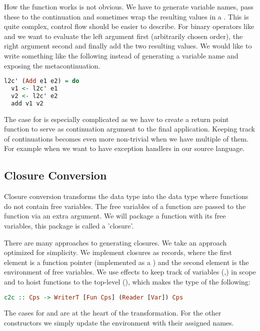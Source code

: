{How the  function works is not obvious. We have to generate variable names, pass these to the continuation and sometimes wrap the resulting values in a . This is quite complex, control flow should be easier to describe. For binary operators like  and  we want to evaluate the left argument first (arbitrarily chosen order), the right argument second and finally add the two resulting values. We would like to write something like the following instead of generating a variable name and exposing the metacontinuation.

\begin{lstlisting}[language=Haskell]
l2c' (Add e1 e2) = do
  v1 <- l2c' e1
  v2 <- l2c' e2
  add v1 v2
\end{lstlisting}

The case for  is especially complicated as we have to create a return point function to serve as continuation argument to the final application. Keeping track of continuations becomes even more non-trivial when we have multiple of them. For example when we want to have exception handlers in our source language.

\subsection{\label{section:closconvert}Closure Conversion}
Closure conversion transforms the  data type into the  data type where functions do not contain free variables. The free variables of a function are passed to the function via an extra argument. We will package a function with its free variables, this package is called a 'closure'.

There are many approaches to generating closures. We take an approach optimized for simplicity. We implement closures as records, where the first element is a function pointer (implemented as a ) and the second element is the environment of free variables. We use effects to keep track of variables (,) in scope and to hoist functions to the top-level (), which makes the type of  the following:

\begin{lstlisting}[language=Haskell]
c2c :: Cps -> WriterT [Fun Cps] (Reader [Var]) Cps
\end{lstlisting}

The cases for  and  are at the heart of the transformation. For the other constructors we simply update the environment with their assigned names.

}
